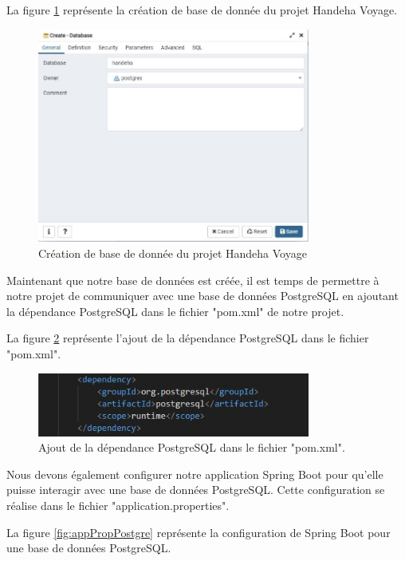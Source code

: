 \documentclass[12pt]{report}
\begin{document}
			La figure \ref{fig:DbCreation} représente la création de base de donnée du projet Handeha Voyage.
			
			\begin{figure}[h]
				\centering
				\includegraphics[width=0.8\textwidth]{DbCreation.jpg}
				\caption{Création de base de donnée du projet Handeha Voyage}
				\label{fig:DbCreation}
			\end{figure}
			\FloatBarrier


			Maintenant que notre base de données est créée, il est temps de permettre à notre projet de communiquer avec une base de données PostgreSQL en ajoutant la dépendance PostgreSQL dans le fichier "pom.xml" de notre projet.

			La figure \ref{fig:pomPostgre} représente l'ajout de la dépendance PostgreSQL dans le fichier "pom.xml".
			
			\begin{figure}[h]
				\centering
				\includegraphics[width=0.8\textwidth]{pomPostgre.jpg}
				\caption{Ajout de la dépendance PostgreSQL dans le fichier "pom.xml".}
				\label{fig:pomPostgre}
			\end{figure}
			\FloatBarrier

			Nous devons également configurer notre application Spring Boot pour qu'elle puisse interagir avec une base de données PostgreSQL. Cette configuration se réalise dans le fichier "application.properties".
	

			La figure \ref{fig:appPropPostgre} représente la configuration de Spring Boot pour une base de données PostgreSQL.
			
\end{document}
